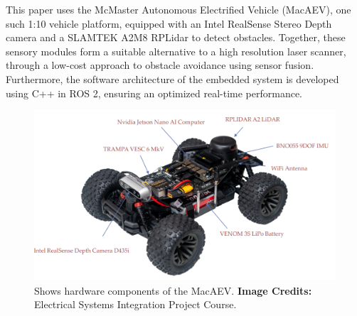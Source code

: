 \documentclass[conference]{IEEEtran}
\begin{document}
This paper uses the McMaster Autonomous Electrified Vehicle (MacAEV), one such 1:10 vehicle platform, equipped with an Intel RealSense Stereo Depth camera and a SLAMTEK A2M8 RPLidar to detect obstacles. Together, these sensory modules form a suitable alternative to a high resolution laser scanner, through a low-cost approach to obstacle avoidance using sensor fusion. Furthermore, the software architecture of the embedded system is developed using C++ in ROS 2, ensuring an optimized real-time performance. 

\begin{figure}
    \centering
    \includegraphics[scale=0.3]{vehicle.png}
    \caption{Shows hardware components of the MacAEV. \textbf{Image Credits:} Electrical Systems Integration Project Course.}
    \label{Figure 1}
\end{figure}


\end{document}
